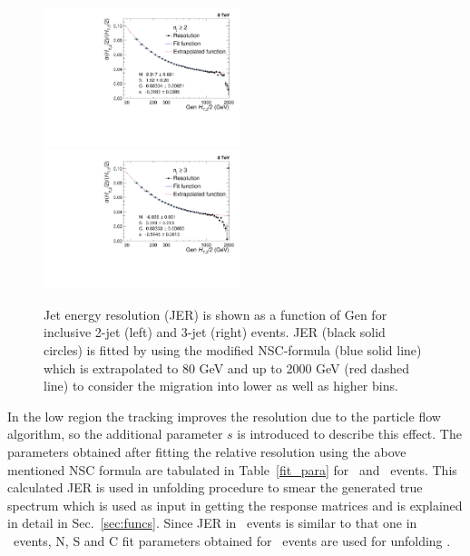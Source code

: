 \begin{figure}[!h]
 \begin{center}
 \hspace*{-5mm}\includegraphics[width=0.51\textwidth]{Plots_HT_2_150/Extrapolate_Sigma_Value_Res_2_crystal_range_ext.pdf}%
 ~~\includegraphics[width=0.51\textwidth]{Plots_HT_2_150/Extrapolate_Sigma_Value_Res_3_crystal_ext.pdf}
 \caption[Jet energy resolution (JER) is shown as a function of Gen \httwo.]{Jet energy resolution (JER) is shown as a function of Gen \httwo for inclusive 2-jet (left) and 3-jet (right) events. JER (black solid circles) is fitted by using the modified NSC-formula (blue solid line) which is extrapolated to 80 GeV and up to 2000 GeV (red dashed line) to consider the migration into lower as well as higher bins.}
 \label{fig:resolution}
 \end{center}
\end{figure}In the low \httwo region the tracking improves the resolution due to the particle flow algorithm, so the additional parameter $s$ is introduced to describe this effect. The parameters obtained after fitting the relative resolution using the above mentioned NSC formula are tabulated in Table~\ref{fit_para} for \njt~and \njth~events. This calculated JER is used in unfolding procedure to smear the generated true spectrum which is used as input in getting the response matrices and is explained in detail in Sec.~\ref{sec:funcs}. Since JER in \njt~events is similar to that one in \njth~events, N, S and C fit parameters obtained for \njth~events are used for unfolding \rations.

